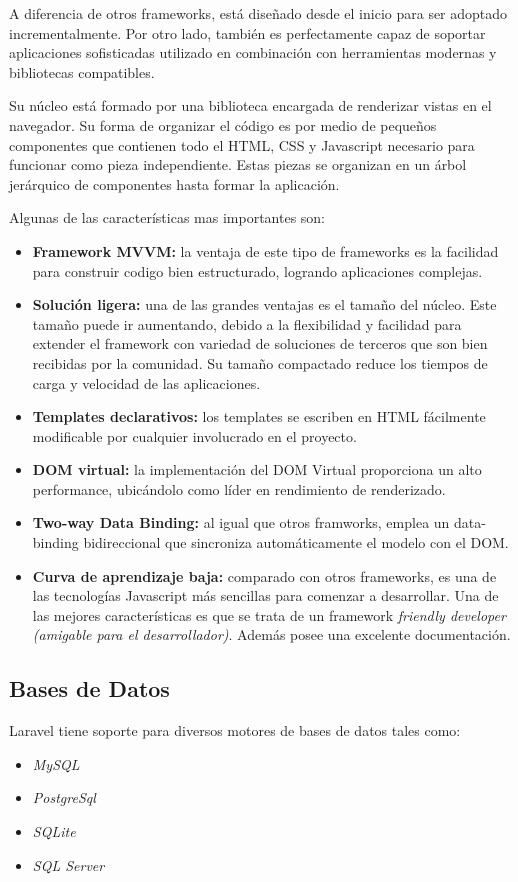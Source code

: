 \documentclass[11pt,oneside]{book}
\begin{document}
A diferencia de otros frameworks, está diseñado desde el inicio para ser adoptado incrementalmente. Por otro lado, también es perfectamente capaz de soportar aplicaciones sofisticadas utilizado en combinación con herramientas modernas y bibliotecas compatibles.

Su núcleo está formado por una biblioteca encargada de renderizar vistas en el navegador. Su forma de organizar el código es por medio de pequeños componentes que contienen todo el HTML, CSS y Javascript necesario para funcionar como pieza independiente. Estas piezas se organizan en un árbol jerárquico de componentes hasta formar la aplicación.

Algunas de las características mas importantes son:
\begin{itemize}
\item \textbf{Framework MVVM:} la ventaja de este tipo de frameworks es la facilidad para construir codigo bien estructurado, logrando aplicaciones complejas.
\item \textbf{Solución ligera:} una de las grandes ventajas es el tamaño del núcleo. Este tamaño puede ir aumentando, debido a la flexibilidad y facilidad para extender el framework con variedad de soluciones de terceros que son bien recibidas por la comunidad. Su tamaño compactado reduce los tiempos de carga y velocidad de las aplicaciones.
\item \textbf{Templates declarativos:} los templates se escriben en HTML fácilmente modificable por cualquier involucrado en el proyecto.
\item \textbf{DOM virtual:} la implementación del DOM Virtual proporciona un alto performance, ubicándolo como líder en rendimiento de renderizado.
\item \textbf{Two-way Data Binding:} al igual que otros framworks, emplea un data-binding bidireccional que sincroniza automáticamente el modelo con el DOM.
\item \textbf{Curva de aprendizaje baja:} comparado con otros frameworks, es una de las tecnologías Javascript más sencillas para comenzar a desarrollar. Una de las mejores características es que se trata de un framework \textit{friendly developer (amigable para el desarrollador)}. Además posee una excelente documentación.
\end{itemize}

\newpage
\subsection{Bases de Datos}
Laravel tiene soporte para diversos motores de bases de datos tales como:
\begin{itemize}
\item \textit{MySQL}
\item \textit{PostgreSql}
\item \textit{SQLite}
\item \textit{SQL Server}
\end{itemize}
\end{document}
